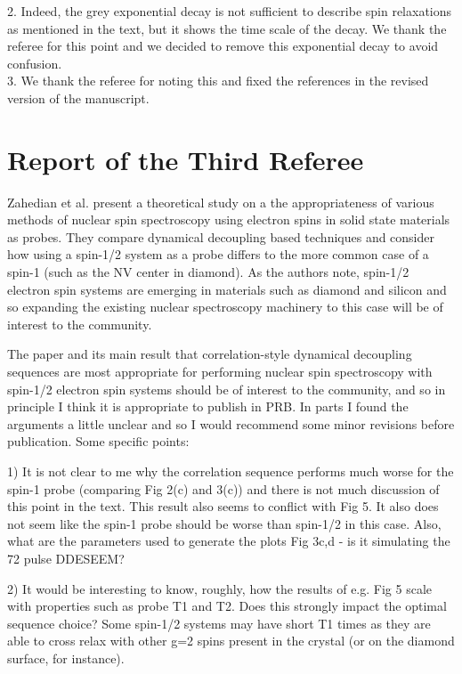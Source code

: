 \documentclass[12pt]{amsart}
\begin{document}
	2. Indeed, the grey exponential decay is not sufficient to describe spin relaxations as mentioned in the text, but it shows the time scale of the decay. We thank the referee for this point and we decided to remove this exponential decay to avoid confusion.\\
	
	3. We thank the referee for noting this and fixed the references in the revised version of the manuscript. 
	

	\color{red} \section{Report of the Third Referee}
	Zahedian et al. present a theoretical study on a the appropriateness of
	various methods of nuclear spin spectroscopy using electron spins in
	solid state materials as probes. They compare dynamical decoupling
	based techniques and consider how using a spin-1/2 system as a probe
	differs to the more common case of a spin-1 (such as the NV center in
	diamond). As the authors note, spin-1/2 electron spin systems are
	emerging in materials such as diamond and silicon and so expanding the
	existing nuclear spectroscopy machinery to this case will be of
	interest to the community.
	
	The paper and its main result that correlation-style dynamical
	decoupling sequences are most appropriate for performing nuclear spin
	spectroscopy with spin-1/2 electron spin systems should be of interest
	to the community, and so in principle I think it is appropriate to
	publish in PRB. In parts I found the arguments a little unclear and so
	I would recommend some minor revisions before publication. Some
	specific points:
	
	1) It is not clear to me why the correlation sequence performs much
	worse for the spin-1 probe (comparing Fig 2(c) and 3(c)) and there is
	not much discussion of this point in the text. This result also seems
	to conflict with Fig 5. It also does not seem like the spin-1 probe
	should be worse than spin-1/2 in this case. Also, what are the
	parameters used to generate the plots Fig 3c,d - is it simulating the
	72 pulse DDESEEM?
	
	2) It would be interesting to know, roughly, how the results of e.g.
	Fig 5 scale with properties such as probe T1 and T2. Does this
	strongly impact the optimal sequence choice? Some spin-1/2 systems may
	have short T1 times as they are able to cross relax with other g=2
	spins present in the crystal (or on the diamond surface, for
	instance).
	
\end{document}
